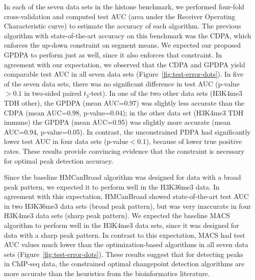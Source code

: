 \documentclass[aoas]{imsart}
\begin{document}
In each of the seven data sets in the histone benchmark,
we performed four-fold cross-validation and computed test AUC (area
under the Receiver Operating Characteristic curve) to estimate the
accuracy of each algorithm. The previous algorithm with
state-of-the-art accuracy on this benchmark was the CDPA, which
enforces the up-down constraint on segment means. We expected our
proposed GPDPA to perform just as well, since it also enforces that
constraint. In agreement with our expectation, we observed that the
CDPA and GPDPA yield comparable test AUC in all seven data sets
(Figure~\ref{fig:test-error-dots}). In five of the seven data sets,
there was no significant difference in test AUC (p-value$>0.1$ in
two-sided paired $t_3$-test). In one of the two other data sets
(H3K4me3 TDH other), the GPDPA (mean AUC=0.97) was slightly less
accurate than the CDPA (mean AUC=0.98, p-value=0.04); in the other
data set (H3K4me3 TDH immune) the GPDPA (mean AUC=0.95) was slightly
more accurate (mean AUC=0.94, p-value=0.05). In contrast, the
unconstrained PDPA had significantly lower test AUC in four data sets
(p-value$<0.1$), because of lower true positive rates. These results
provide convincing evidence that the constraint is necessary for
optimal peak detection accuracy.

Since the baseline HMCanBroad algorithm was designed for data with a
broad peak pattern, we expected it to perform well in the H3K36me3
data. In agreement with this expectation, HMCanBroad showed
state-of-the-art test AUC in two H3K36me3 data sets (broad peak
pattern), but was very inaccurate in four H3K4me3 data sets (sharp
peak pattern). We expected the baseline MACS algorithm to perform well
in the H3K4me3 data sets, since it was designed for data with a sharp
peak pattern. In contrast to this expectation, MACS had test AUC
values much lower than the optimization-based algorithms in all seven
data sets (Figure~\ref{fig:test-error-dots}). These results suggest
that for detecting peaks in ChIP-seq data, the constrained optimal
changepoint detection algorithms are more accurate than the heuristics
from the bioinformatics literature.


%   
\end{document}
